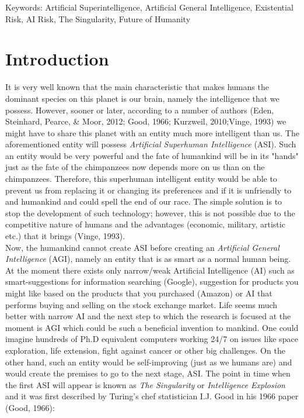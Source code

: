 \documentclass[11pt]{article}
\begin{document}
Keywords: Artificial Superintelligence, Artificial General Intelligence, Existential Risk, AI Risk, The Singularity, Future of Humanity

\section*{Introduction}
	It is very well known that the main characteristic that makes humans the dominant species on this planet is our brain, namely the intelligence that we possess. However, sooner or later, according to a number of authors (Eden, Steinhard, Pearce, \& Moor, 2012;  Good, 1966; Kurzweil, 2010;Vinge, 1993)  we might have to share this planet with an entity  much more intelligent than us. The aforementioned entity will possess \textit{Artificial Superhuman Intelligence} (ASI). Such an entity would be very powerful and the fate of humankind will be in its "hands" just as the fate of the chimpanzees now depends more on us than on the chimpanzees. Therefore, this superhuman intelligent entity would be able to prevent us from replacing it or changing its preferences and if it is unfriendly to and humankind and could spell the end of our race. The simple solution is to stop the development of such technology; however, this is not possible due to the competitive nature of humans and the advantages (economic, military, artistic etc.) that it brings (Vinge, 1993). \\
	
	\indent
	Now, the humankind cannot create ASI before creating an \textit{Artificial General Intelligence} (AGI), namely  an entity that is as smart as a normal human being. At the moment there exists only narrow/weak Artificial Intelligence (AI) such as smart-suggestions for information searching (Google), suggestion for products you might like based on the products that you purchased (Amazon) or AI that performs buying and selling on the stock exchange market. Life seems much better with narrow AI and the next step to which the research is focused at the moment is AGI which could be such a beneficial invention to mankind. One could imagine hundreds of Ph.D equivalent computers working 24/7 on issues like space exploration, life extension, fight against cancer or other big challenges. On the other hand, such an entity would be self-improving (just as we humans are) and would create the premises to go to the next stage, ASI. The point in time when the first ASI will appear is known as \textit {The Singularity} or \textit{Intelligence Explosion}  and it was first described by Turing's chef statistician I.J. Good in his 1966 paper (Good, 1966):
\end{document}
